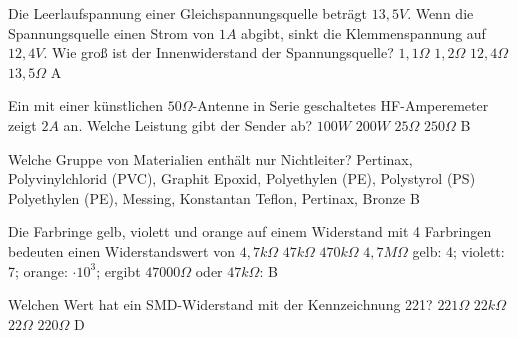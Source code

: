 {Die Leerlaufspannung einer Gleichspannungsquelle beträgt $13,5V$. Wenn die
Spannungsquelle einen Strom von $1A$ abgibt, sinkt die Klemmenspannung auf
$12,4V$. Wie groß ist der Innenwiderstand der Spannungsquelle?}%
{$1,1\Omega$}%
{$1,2\Omega$}%
{$12,4\Omega$}%
{$13,5\Omega$}%
{A}%

{Ein mit einer künstlichen $50\Omega$-Antenne in Serie geschaltetes
HF-Amperemeter zeigt $2A$ an. Welche Leistung gibt der Sender ab?}%
{$100W$}%
{$200W$}%
{$25\Omega$}%
{$250\Omega$}%
{B}%

{Welche Gruppe von Materialien enthält nur Nichtleiter?}%
{Pertinax, Polyvinylchlorid (PVC), Graphit}%
{Epoxid, Polyethylen (PE), Polystyrol (PS)}%
{Polyethylen (PE), Messing, Konstantan}%
{Teflon, Pertinax, Bronze}%
{B}%


{Die Farbringe gelb, violett und orange auf einem Widerstand mit 4 Farbringen bedeuten einen Widerstandswert von}%
{$4,7k\Omega$}%
{$47k\Omega$}%
{$470k\Omega$}%
{$4,7M\Omega$}%
{gelb: 4; violett: 7; orange: $\cdot 10^3$; ergibt $47000\Omega$ oder $47k\Omega$: B}%

{Welchen Wert hat ein SMD-Widerstand mit der Kennzeichnung 221?}%
{$221\Omega$}%
{$22k\Omega$}%
{$22\Omega$}%
{$220\Omega$}%
{D}%

